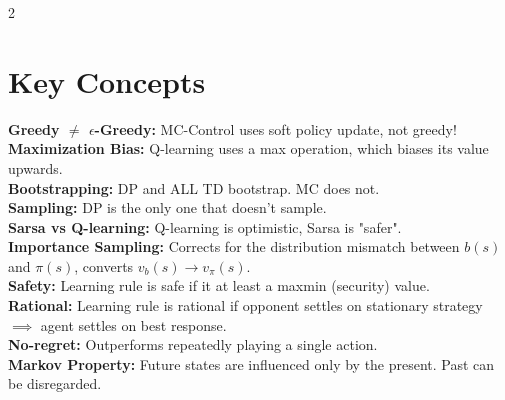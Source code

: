 \documentclass[10pt]{article}
\begin{document}
\begin{multicols*}{2}

	\section*{Key Concepts}
	\textbf{Greedy $\ne$ $\epsilon$-Greedy:} MC-Control uses soft policy update, not greedy!\\
	\textbf{Maximization Bias:} Q-learning uses a max operation, which biases its value upwards.\\
	\textbf{Bootstrapping:} DP and ALL TD bootstrap. MC does not.\\
	\textbf{Sampling:} DP is the only one that doesn't sample.\\
	\textbf{Sarsa vs Q-learning:} Q-learning is optimistic, Sarsa is "safer". \\
	\textbf{Importance Sampling:} Corrects for the distribution mismatch between $b(s)$ and $\pi(s)$, converts $v_b(s) \rightarrow v_\pi(s)$. \\
	\textbf{Safety:} Learning rule is safe if it at least a maxmin (security) value. \\
	\textbf{Rational:} Learning rule is rational if opponent settles on stationary strategy $\implies$ agent settles on best response. \\
	\textbf{No-regret:} Outperforms repeatedly playing a single action. \\
	\textbf{Markov Property:} Future states are influenced only by the present. Past can be disregarded.


\end{multicols*}
\end{document}
